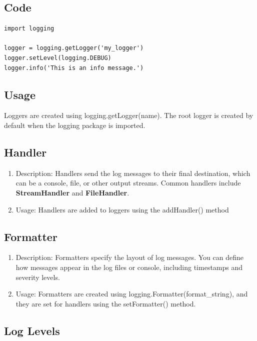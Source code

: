 \subsection{Code}

  \begin{lstlisting}
import logging
    
logger = logging.getLogger('my_logger')
logger.setLevel(logging.DEBUG)
logger.info('This is an info message.')
  \end{lstlisting}
  
\subsection{Usage}

 Loggers are created using logging.getLogger(name). The root logger is created by default when the logging package is imported.

  
\subsection{Handler}

  \begin{enumerate}
    \item Description: Handlers send the log messages to their final destination, which can be a console, file, or other output streams. Common handlers include \textbf{StreamHandler} and \textbf{FileHandler}.
    \item Usage: Handlers are added to loggers using the addHandler() method\cite{logging_security}
  \end{enumerate}

\subsection{Formatter}

  \begin{enumerate}
    \item   Description: Formatters specify the layout of log messages. You can define how messages appear in the log files or console, including timestamps and severity levels.
    \item Usage: Formatters are created using logging.Formatter(format\_string), and they are set for handlers using the setFormatter() method.
  \end{enumerate}
  
\subsection{Log Levels}


